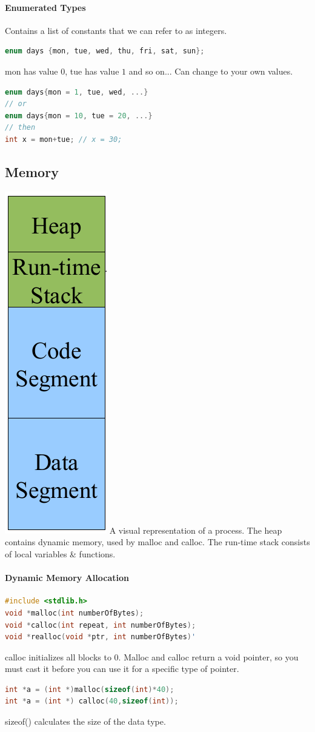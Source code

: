 \documentclass[12 pt]{article}
\begin{document}
\paragraph{Enumerated Types}
Contains a list of constants that we can refer to as integers.
\begin{lstlisting}[language=c]
enum days {mon, tue, wed, thu, fri, sat, sun};
\end{lstlisting}
mon has value $0$, tue has value $1$ and so on... Can change to your own values.
\begin{lstlisting}[language=c]
enum days{mon = 1, tue, wed, ...}
// or
enum days{mon = 10, tue = 20, ...}
// then
int x = mon+tue; // x = 30;
\end{lstlisting}
\subsection{Memory}
\includegraphics[scale=0.3]{proc} A visual representation of a process. The heap contains dynamic memory, used by malloc and calloc. The run-time stack consists of local variables \& functions.
\paragraph{Dynamic Memory Allocation}
\begin{lstlisting}[language=c]
#include <stdlib.h>
void *malloc(int numberOfBytes);
void *calloc(int repeat, int numberOfBytes);
void *realloc(void *ptr, int numberOfBytes)' 
\end{lstlisting}
calloc initializes all blocks to $0$. Malloc and calloc return a void pointer, so you must cast it before you can use it for a specific type of pointer.
\begin{lstlisting}[language=c]
int *a = (int *)malloc(sizeof(int)*40);
int *a = (int *) calloc(40,sizeof(int));
\end{lstlisting}
sizeof() calculates the size of the data type.
\end{document}
